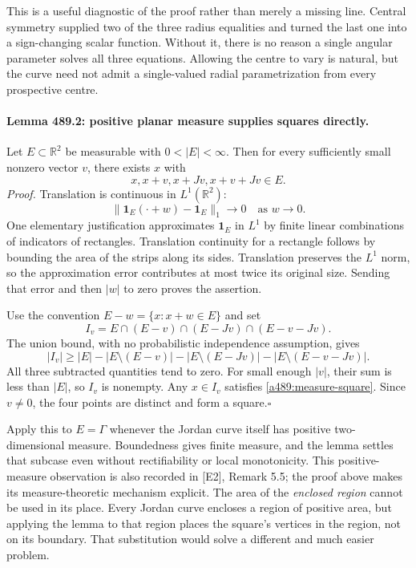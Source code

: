 \documentclass[11pt]{article}
\begin{document}
This is a useful diagnostic of the proof rather than merely a missing
line. Central symmetry supplied two of the three radius equalities and
turned the last one into a sign-changing scalar function. Without it,
there is no reason a single angular parameter solves all three equations.
Allowing the centre to vary is natural, but the curve need not admit a
single-valued radial parametrization from every prospective centre.

\paragraph{Lemma 489.2: positive planar measure supplies squares directly.}
Let $E\subset\mathbb R^2$ be measurable with $0<|E|<\infty$.
Then for every sufficiently small nonzero vector $v$, there exists $x$ with
\begin{equation}\label{a489:measure-square}
                         x,x+v,x+Jv,x+v+Jv\in E.
\end{equation}
\emph{Proof.} Translation is continuous in $L^1(\mathbb R^2)$:
\[
          \|\mathbf{1}_E(\cdot+w)-\mathbf{1}_E\|_1\longrightarrow0
                                  \quad\text{as }w\to0.
\]
One elementary justification approximates $\mathbf{1}_E$ in $L^1$ by
finite linear combinations of indicators of rectangles. Translation
continuity for a rectangle follows by bounding the area of the strips along
its sides. Translation preserves the $L^1$ norm, so the approximation
error contributes at most twice its original size. Sending that error and
then $|w|$ to zero proves the assertion.

Use the convention $E-w=\{x:x+w\in E\}$ and set
\[
             I_v=E\cap(E-v)\cap(E-Jv)\cap(E-v-Jv).
\]
The union bound, with no probabilistic independence assumption, gives
\[
 |I_v|\ge |E|-|E\setminus(E-v)|-|E\setminus(E-Jv)|
                           -|E\setminus(E-v-Jv)|.
\]
All three subtracted quantities tend to zero. For small enough $|v|$,
their sum is less than $|E|$, so $I_v$ is nonempty. Any $x\in I_v$
satisfies \eqref{a489:measure-square}. Since $v\ne0$, the four points
are distinct and form a square.\hfill$\square$

Apply this to $E=\Gamma$ whenever the Jordan curve itself has positive
two-dimensional measure. Boundedness gives finite measure, and the lemma
settles that subcase even without rectifiability or local monotonicity.
This positive-measure observation is also recorded in [E2], Remark 5.5;
the proof above makes its measure-theoretic mechanism explicit. The area
of the \emph{enclosed region} cannot be used in its place. Every Jordan
curve encloses a region of positive area, but applying the lemma to that
region places the square's vertices in the region, not on its boundary.
That substitution would solve a different and much easier problem.
\end{document}
